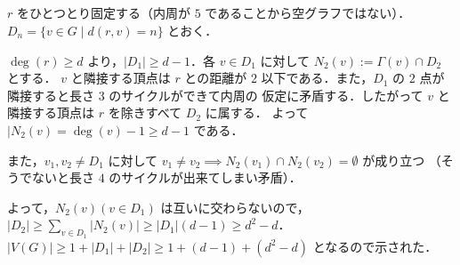 \subsection{}
$r$ をひとつとり固定する（内周が $5$ であることから空グラフではない）．
$D_n = \{v\in G\mid d(r,v) = n\}$ とおく．

$\deg(r) \geq d$ より，$|D_1|\geq d-1$．各 $v\in D_1$ に対して $N_2(v) := \Gamma(v) \cap D_2$ とする．
$v$ と隣接する頂点は $r$ との距離が $2$ 以下である．また，$D_1$ の $2$ 点が隣接すると長さ $3$ のサイクルができて内周の
仮定に矛盾する．したがって $v$ と隣接する頂点は $r$ を除きすべて $D_2$ に属する．
よって $|N_2(v) = \deg(v) - 1\geq d - 1$ である．

また，$v_1,v_2\neq D_1$ に対して $v_1\neq v_2\implies N_2(v_1)\cap N_2(v_2) = \emptyset$ が成り立つ
（そうでないと長さ $4$ のサイクルが出来てしまい矛盾）．

よって，$N_2(v) (v\in D_1)$ は互いに交わらないので，$|D_2| \geq \sum_{v\in D_1} |N_2(v)|\geq |D_1|(d-1)\geq d^2-d$．
$|V(G)| \geq 1 + |D_1| + |D_2| \geq 1 + (d-1) + (d^2-d)$ となるので示された．